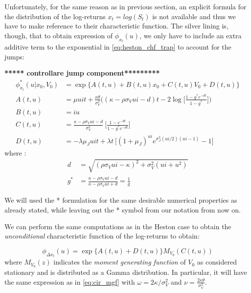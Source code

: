 Unfortunately, for the same reason as in previous section, an explicit formula for the distribution of the log-returns $x_t = log(S_t)$ is not available and thus we have to make reference to their characteristic function.
The silver lining is, though, that to obtain expression of   $\phi_{x_t}(u)$, we only have to include an extra additive term to the exponential in \eqref{eq:heston_chf_trap} to account for the jumps:

\textbf{***** controllare jump component*********}
\begin{equation}
\begin{split}
\label{eq:bates_chf_trap}
\phi_{x_t}^*(u| x_0, V_0) &= \exp\{A(t,u) + B(t,u) x_0 + C(t,u) V_0 + D(t,u)\}\\
A(t,u) &= \mu u i t +  \frac{\kappa\theta}{\sigma_V^2} \bigg( (\kappa - \rho\sigma_V u i - d)t - 2 \log\Big[  \frac{1-g^*e^{-dt}}{1-g^*} \Big] \bigg)\\
B(t,u) &= i u \\
C(t,u)&= \frac{\kappa - \rho\sigma_V u i - d}{\sigma_V^2} \:\Big[\frac{1-e^{-dt}}{1-g^*e^{-dt}}\Big]\\
D(t,u) &= -\lambda \mu_J u i t + \lambda t  \:\Big[ (1+\mu_J)^{ui} e^{\sigma_J^2(ui/2)(ui-1)}-1 \Big]
\end{split}
\end{equation} 
where :
\begin{equation*}
\begin{split}
d&=\sqrt{(\rho \sigma_V u i - \kappa)^2 + \sigma_V^2(u i + u^2)}\\
g^*&= \frac{\kappa - \rho\sigma_V u i - d}{\kappa - \rho\sigma_V u i + d} = \frac{1}{g}
\end{split}
\end{equation*} 

We will used the  *  formulation for the same desirable numerical properties as already stated, while leaving out the * symbol from our notation from now on.

We can perform the same computations as in the Heston case to obtain the \textit{unconditional} characteristic function of the log-returns to obtain:

\begin{equation}
\label{eq:bates_uncond_chf}
\phi_{\Delta x_t}(u) =  \exp\{A(t,u) + D(t,u)\} M_{V_0}(C(t,u))
\end{equation}
where $M_{V_0}(z)$ indicates the \textit{moment generating function} of $V_0$ as considered stationary and is distributed as a Gamma distribution. In particular, it will have the same expression as in \eqref{eq:cir_mgf} with $\omega = {2\kappa} / {\sigma_V^2} $
and $\nu= \frac{2\kappa\theta}{\sigma_V^2}$.

